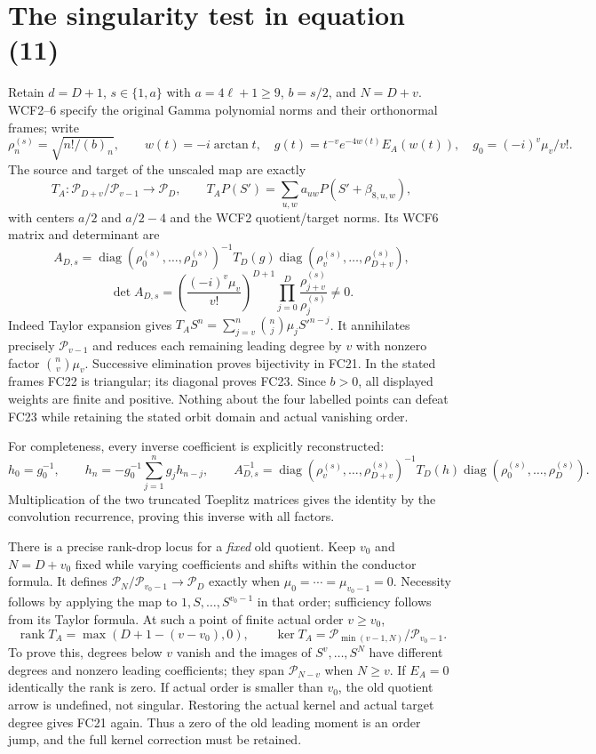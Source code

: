 \documentclass[11pt]{article}
\newcommand{\diag}{\operatorname{diag}}
\newcommand{\rank}{\operatorname{rank}}
\begin{document}
\section{The singularity test in equation (11)}
Retain $d=D+1$, $s\in\{1,a\}$ with $a=4\ell+1\ge9$,
$b=s/2$, and $N=D+v$. WCF2--6 specify the original Gamma polynomial
norms and their orthonormal frames; write
\[
 \rho_n^{(s)}=\sqrt{n!/(b)_n},\qquad
 w(t)=-i\arctan t,\quad
 g(t)=t^{-v}e^{-4w(t)}E_A(w(t)),\quad
 g_0=(-i)^v\mu_v/v!.
 \tag{FC20}
\]
The source and target of the unscaled map are exactly
\[
 T_A:\mathcal P_{D+v}/\mathcal P_{v-1}\to\mathcal P_D,
 \qquad T_AP(S')=\sum_{u,w}a_{uw}P(S'+\beta_{8,u,w}),
 \tag{FC21}
\]
with centers $a/2$ and $a/2-4$ and the WCF2 quotient/target norms.
Its WCF6 matrix and determinant are
\[
 A_{D,s}=\diag(\rho_0^{(s)},\ldots,\rho_D^{(s)})^{-1}
 T_D(g)\diag(\rho_v^{(s)},\ldots,\rho_{D+v}^{(s)}),
 \tag{FC22}
\]
\[
 \det A_{D,s}=\left(\frac{(-i)^v\mu_v}{v!}\right)^{D+1}
 \prod_{j=0}^D\frac{\rho_{j+v}^{(s)}}{\rho_j^{(s)}}\ne0.
 \tag{FC23}
\]
Indeed Taylor expansion gives
$T_AS^n=\sum_{j=v}^n\binom nj\mu_j S'^{n-j}$.
It annihilates precisely $\mathcal P_{v-1}$ and reduces each remaining
leading degree by $v$ with nonzero factor $\binom nv\mu_v$.
Successive elimination proves bijectivity in FC21. In the stated frames
FC22 is triangular; its diagonal proves FC23. Since $b>0$, all displayed
weights are finite and positive. Nothing about the four labelled points
can defeat FC23 while retaining the stated orbit domain and actual
vanishing order.

For completeness, every inverse coefficient is explicitly reconstructed:
\[
 h_0=g_0^{-1},\qquad
 h_n=-g_0^{-1}\sum_{j=1}^ng_jh_{n-j},\qquad
 A_{D,s}^{-1}=\diag(\rho_v^{(s)},\ldots,\rho_{D+v}^{(s)})^{-1}
 T_D(h)\diag(\rho_0^{(s)},\ldots,\rho_D^{(s)}).
 \tag{FC24}
\]
Multiplication of the two truncated Toeplitz matrices gives the identity
by the convolution recurrence, proving this inverse with all factors.

There is a precise rank-drop locus for a \emph{fixed} old quotient.
Keep $v_0$ and $N=D+v_0$ fixed while varying coefficients and shifts
within the conductor formula. It defines
$\mathcal P_N/\mathcal P_{v_0-1}\to\mathcal P_D$ exactly when
$\mu_0=\cdots=\mu_{v_0-1}=0$. Necessity follows by applying the map to
$1,S,\ldots,S^{v_0-1}$ in that order; sufficiency follows from its Taylor
formula. At such a point of finite actual order $v\ge v_0$,
\[
 \rank T_A=\max(D+1-(v-v_0),0),\qquad
 \ker T_A=\mathcal P_{\min(v-1,N)}/\mathcal P_{v_0-1}.
 \tag{FC25}
\]
To prove this, degrees below $v$ vanish and the images of
$S^v,\ldots,S^N$ have different degrees and nonzero leading coefficients;
they span $\mathcal P_{N-v}$ when $N\ge v$. If $E_A=0$ identically the
rank is zero. If actual order is smaller than $v_0$, the old quotient
arrow is undefined, not singular. Restoring the actual kernel and actual
target degree gives FC21 again. Thus a zero of the old leading moment
is an order jump, and the full kernel correction must be retained.
\end{document}
